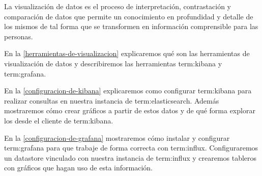 La visualización de datos es el proceso de interpretación, contrastación y
comparación de datos que permite un conocimiento en profundidad y detalle de
los mismos de tal forma que se transformen en información comprensible para las
personas.

En la \autoref{herramientas-de-visualizacion} explicaremos qué son las
herramientas de visualización de datos y describiremos las herramientas
\gls{term:kibana} y \gls{term:grafana}.

En la \autoref{configuracion-de-kibana} explicaremos como configurar
\gls{term:kibana} para realizar consultas en nuestra instancia de
\gls{term:elasticsearch}. Además mostraremos cómo crear gráficos a partir de
estos datos y de qué forma explorar los  desde el cliente  de
\gls{term:kibana}.

En la \autoref{configuracion-de-grafana} mostraremos cómo instalar y configurar
\gls{term:grafana} para que trabaje de forma correcta con \gls{term:influx}.
Configuraremos un datastore vinculado con nuestra instancia de \gls{term:influx} y
crearemos tableros con gráficos que hagan uso de esta información.
